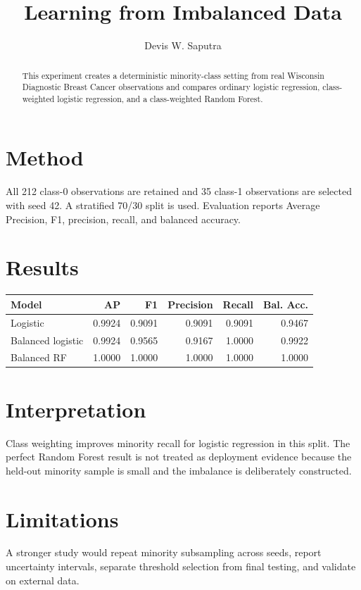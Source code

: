 \documentclass[11pt]{article}
\title{Learning from Imbalanced Data}
\author{Devis W. Saputra}
\begin{document}
\maketitle

\begin{abstract}
This experiment creates a deterministic minority-class setting from real Wisconsin Diagnostic Breast Cancer observations and compares ordinary logistic regression, class-weighted logistic regression, and a class-weighted Random Forest.
\end{abstract}

\section{Method}
All 212 class-0 observations are retained and 35 class-1 observations are selected with seed 42. A stratified 70/30 split is used. Evaluation reports Average Precision, F1, precision, recall, and balanced accuracy.

\section{Results}
\begin{tabular}{lrrrrr}
\toprule
Model & AP & F1 & Precision & Recall & Bal. Acc. \\
\midrule
Logistic & 0.9924 & 0.9091 & 0.9091 & 0.9091 & 0.9467 \\
Balanced logistic & 0.9924 & 0.9565 & 0.9167 & 1.0000 & 0.9922 \\
Balanced RF & 1.0000 & 1.0000 & 1.0000 & 1.0000 & 1.0000 \\
\bottomrule
\end{tabular}

\section{Interpretation}
Class weighting improves minority recall for logistic regression in this split. The perfect Random Forest result is not treated as deployment evidence because the held-out minority sample is small and the imbalance is deliberately constructed.

\section{Limitations}
A stronger study would repeat minority subsampling across seeds, report uncertainty intervals, separate threshold selection from final testing, and validate on external data.
\end{document}
